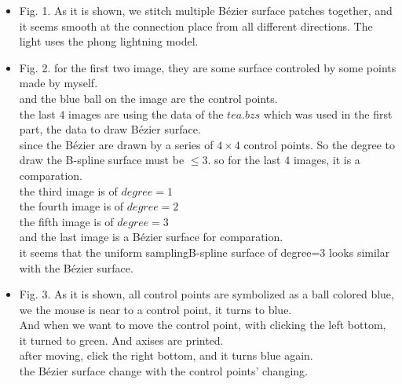 \documentclass[acmtog]{acmart}
\begin{document}
\begin{itemize}
	\item Fig. 1. As it is shown, we stitch multiple Bézier surface patches together,
	and it seems smooth at the connection place from all different directions. The light uses the phong lightning model. 
	
	\item Fig. 2. for the first two image, they are some surface controled by some points made by myself.\\
	and the blue ball on the image are the control points.\\
	the last $4$ images are using the data of the $tea.bzs$ which was used in the first part, the data to draw Bézier surface.\\
	since the Bézier are drawn by a series of $4 \times 4$ control points. So the degree to draw the B-spline surface must be $\leq 3$.
	so for the last $4$ images, it is a comparation.\\
	the third image is of $degree=1$\\
	the fourth image is of $degree=2$\\
	the fifth image is of $degree=3$\\
	and the last image is a Bézier surface for comparation.\\
	it seems that the uniform samplingB-spline surface of degree=3 looks similar with the Bézier surface.

	\item Fig. 3. As it is shown, all control points are symbolized as a ball colored blue, we the mouse is near to a control point,
	it turns to blue.\\
	And when we want to move the control point, with clicking the left bottom, it turned to green. And axises are printed.\\
	after moving, click the right bottom, and it turns blue again.\\ 
	the Bézier surface change with the control points' changing.
	
	\end{itemize}
\end{document}
